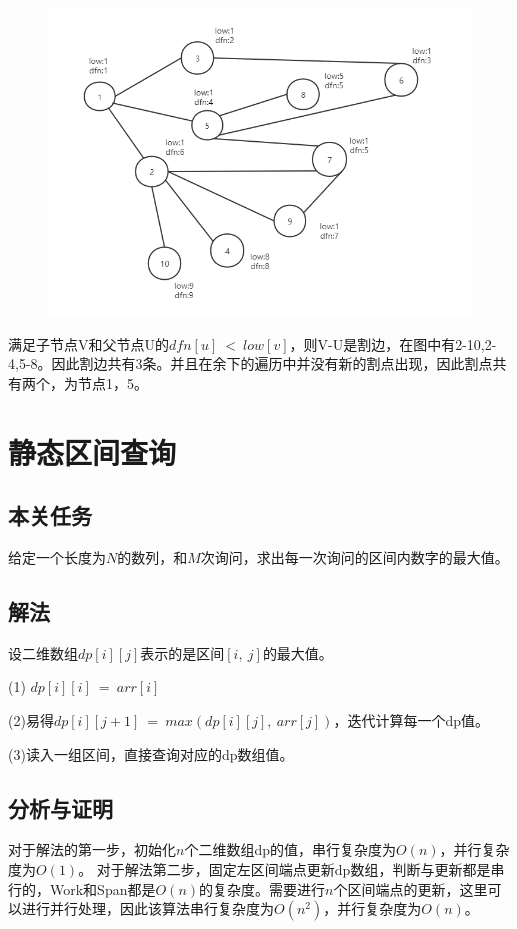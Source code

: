 \documentclass[UTF8,a4paperdui, %
]{ctexart}
\begin{document}
\begin{figure}[ht]
\centering
\includegraphics[scale=0.45]{picture3.png}
\end{figure}

满足子节点V和父节点U的$dfn[u]\ <\ low[v]$，则V-U是割边，在图中有2-10,2-4,5-8。因此割边共有3条。并且在余下的遍历中并没有新的割点出现，因此割点共有两个，为节点1，5。

\section{静态区间查询}
\subsection{本关任务}
给定一个长度为$N$的数列，和$M$次询问，求出每一次询问的区间内数字的最大值。
\subsection{解法}
设二维数组$dp[i][j]$表示的是区间$[i,\ j]$的最大值。

(1) $dp[ i ][ i ]\ =\ arr[ i ]$

(2)易得$dp[i][j+1]\ =\ max(dp[i][j],\ arr[j])$，迭代计算每一个dp值。

(3)读入一组区间，直接查询对应的dp数组值。
\subsection{分析与证明}
对于解法的第一步，初始化$n$个二维数组dp的值，串行复杂度为$O(n)$，并行复杂度为$O(1)$。
对于解法第二步，固定左区间端点更新dp数组，判断与更新都是串行的，Work和Span都是$O(n)$的复杂度。需要进行$n$个区间端点的更新，这里可以进行并行处理，因此该算法串行复杂度为$O(n^2)$，并行复杂度为$O(n)$。
\end{document}
